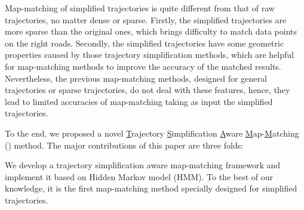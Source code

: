 Map-matching of simplified trajectories is quite different from that of raw trajectories, no matter dense or sparse.
Firstly, the simplified trajectories are more sparse than the original ones, which brings difficulty to match data points on the right roads.
Secondly, the simplified trajectories have some geometric properties caused by those trajectory simplification methods,
which are helpful for map-matching methods to improve the accuracy of the matched results.
Nevertheless, the previous map-matching methods, designed for general
trajectories or sparse trajectories, do not deal with these features, hence, they lead to limited accuracies of map-matching taking as input the simplified trajectories.



To the end, we proposed a novel \underline{T}rajectory \underline{S}implification \underline{A}ware \underline{M}ap-\underline{M}atching (\stmm) method.
The major contributions of this paper are three folds:

 We develop a trajectory simplification aware map-matching framework and implement it based on Hidden Markov model (HMM). To the best of our knowledge, it is the first map-matching method specially designed for simplified trajectories.

